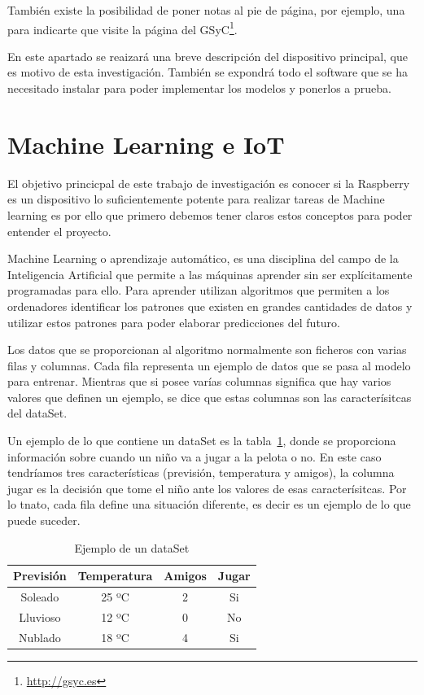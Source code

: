 \documentclass[a4paper, 12pt]{book}
\begin{document}
También existe la posibilidad de poner notas al pie de página, por ejemplo, una para indicarte que visite la página del GSyC\footnote{\url{http://gsyc.es}}.

En este apartado se reaizará una breve descripción del dispositivo principal, que es motivo de esta investigación. También se expondrá todo el software que se ha necesitado instalar para poder implementar los modelos y ponerlos a prueba.

\section{Machine Learning e IoT}
\label{sec:machine_learning}

El objetivo princicpal de este trabajo de investigación es conocer si la Raspberry es un dispositivo lo suficientemente potente para realizar tareas de Machine learning es por ello que primero debemos tener claros estos conceptos para poder entender el proyecto.

 Machine Learning o aprendizaje automático, es una disciplina del campo de la Inteligencia Artificial que permite a las máquinas aprender sin ser explícitamente programadas para ello. Para aprender utilizan algoritmos que permiten a los ordenadores identificar los patrones que existen en grandes cantidades de datos y utilizar estos patrones para poder elaborar predicciones del futuro. 
 
 Los datos que se proporcionan al algoritmo normalmente son ficheros con varias filas y columnas. Cada fila representa un ejemplo de datos que se pasa al modelo para entrenar. Mientras que si posee varías columnas significa que hay varios valores que definen un ejemplo, se dice que estas columnas son las caracterísitcas del dataSet. 
 
 Un ejemplo de lo que contiene un dataSet es la tabla~\ref{tab:my_dataSet}, donde se proporciona información sobre cuando un niño va a jugar a la pelota o no. En este caso tendríamos tres características (previsión, temperatura y amigos), la columna jugar es la decisión que tome el niño ante los valores de esas caracterísitcas. Por lo tnato, cada fila define una situación diferente, es decir es un ejemplo de lo que puede suceder.
 
 \begin{table}[]
     \centering
     \begin{tabular}{| c | c | c | c |}
            \hline
          Previsión & Temperatura & Amigos & Jugar\\
          \hline
           Soleado &  25 ºC & 2 & Si \\
           \hline
           Lluvioso &  12 ºC & 0 & No\\
           \hline
           Nublado &  18 ºC & 4 & Si\\
           \hline
     \end{tabular}
     \caption{Ejemplo de un dataSet}
     \label{tab:my_dataSet}
 \end{table}
 
\end{document}
